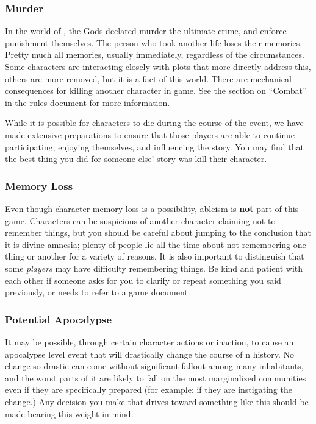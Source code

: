 \documentclass[sheet]{GL2020}
\begin{document}
\subsubsection{Murder}
In the world of \pEarth{}, the Gods declared murder the ultimate crime, and enforce punishment themselves. The person who took another life loses their memories. Pretty much all memories, usually immediately, regardless of the circumstances. Some characters are interacting closely with plots that more directly address this, others are more removed, but it is a fact of this world. There are mechanical consequences for killing another character in game. See the section on ``Combat'' in the rules document for more information.

While it is possible for characters to die during the course of the event, we have made extensive preparations to ensure that those players are able to continue participating, enjoying themselves, and influencing the story. You may find that the best thing you did for someone else' story was kill their character.

\subsubsection{Memory Loss}
Even though character memory loss is a possibility, ableism is \textbf{not} part of this game. Characters can be suspicious of another character claiming not to remember things, but you should be careful about jumping to the conclusion that it is divine amnesia; plenty of people lie all the time about not remembering one thing or another for a variety of reasons. It is also important to distinguish that some \emph{players} may have difficulty remembering things. Be kind and patient with each other if someone asks for you to clarify or repeat something you said previously, or needs to refer to a game document.

\subsubsection{Potential Apocalypse}
It may be possible, through certain character actions or inaction, to cause an apocalypse level event that will drastically change the course of \pEarth{}n history. No change so drastic can come without significant fallout among many inhabitants, and the worst parts of it are likely to fall on the most marginalized communities even if they are specifically prepared (for example: if they are instigating the change.) Any decision you make that drives toward something like this should be made bearing this weight in mind.
\end{document}

